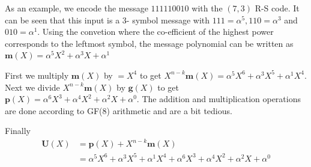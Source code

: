 \documentclass[fontsize=12pt]{article}
\begin{document}
As an example, we encode the message $111110010$ with the $(7,3)$ R-S code. It can be seen that this input is a 3- symbol message with $111=\alpha^5, 110 = \alpha^3$ and $010=\alpha^1$. Using the convetion where the co-efficient of the highest power corresponds to the leftmost symbol, the message polynomial can be written as $\mathbf{m}(X) = \alpha^5X^2 + \alpha^3X + \alpha^1$

First we multiply $\mathbf{m}(X)$ by $ = X^{4 }$ to get $X^{n-k}\mathbf{m}(X) = \alpha^5X^6 + \alpha^3X^5 + \alpha^1X^4$.
Next we divide $X^{n-k}\mathbf{m}(X)$ by $\mathbf{g}(X)$ to get $\mathbf{p}(X) =\alpha^6X^3 + \alpha^4X^2 + \alpha^2X +\alpha^0$. The addition and multiplication operations are done according to GF(8) arithmetic and are a bit tedious.

Finally
\begin{equation}
\begin{split}
\mathbf{U}(X)&= \mathbf{p}(X) + X^{n-k}\mathbf{m}(X)\\
&=\alpha^5X^6 + \alpha^3X^5 + \alpha^1X^4+\alpha^6X^3 + \alpha^4X^2 + \alpha^2X +\alpha^0
\end{split}
\end{equation}
\end{document}
